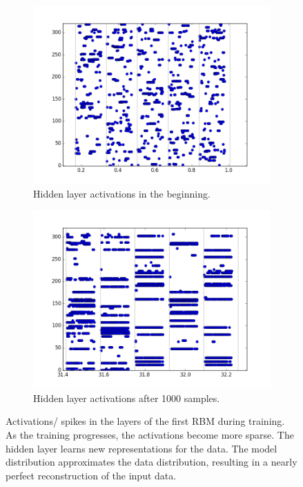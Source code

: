 \begin{figure}[h!]
	\begin{subfigure}[t]{.45\textwidth}
  		\centering
  		\includegraphics[width=.9\linewidth]{imgs/7x7/00006_h.png}
  		\caption{Hidden layer activations in the beginning.}
  		\label{fig:sub2}
	\end{subfigure}
	\begin{subfigure}[t]{.45\textwidth}
  		\centering
  		\includegraphics[width=.9\linewidth]{imgs/7x7/01992_h.png}
  		\caption{Hidden layer  activations after 1000 samples.}
  		\label{fig:sub2}
	\end{subfigure}
	\caption{Activations/ spikes in the layers of the first RBM during training. As the training progresses, the activations become more sparse. The hidden layer learns new representations for the data. The model distribution approximates the data distribution, resulting in a nearly perfect reconstruction of the input data.}
	\label{fig:stripes}
\end{figure}



